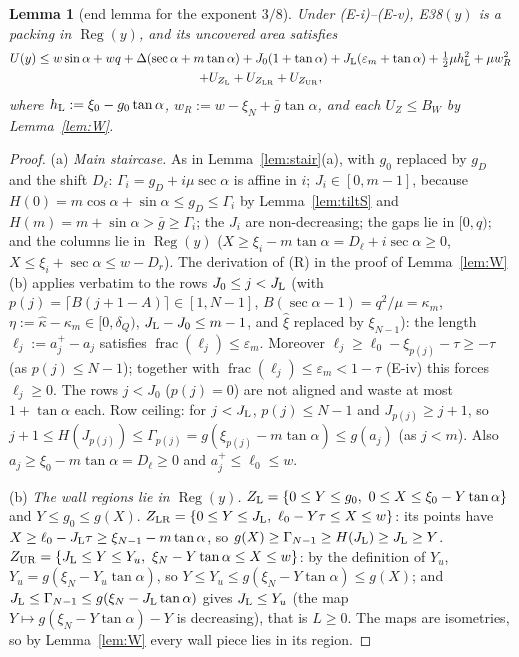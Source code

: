 \documentclass[11pt]{amsart}
\newcommand{\Reg}{\operatorname{Reg}}
\newcommand{\ca}{\cos\alpha}
\newcommand{\sa}{\sin\alpha}
\newcommand{\ta}{\tan\alpha}
\newcommand{\se}{\sec\alpha}
\newtheorem{lemma}[theorem]{Lemma}
\theoremstyle{definition}
\theoremstyle{remark}
\numberwithin{equation}{section}
\begin{document}
\begin{lemma}[end lemma for the exponent $3/8$]\label{lem:E38}
Under (E-i)--(E-v), E38$(y)$ is a packing in $\Reg(y)$, and its uncovered area satisfies
\begin{multline*}
U(y)\le w\sa+wq+\Delta(\se+m\ta)+J_0(1+\ta)+J_{\rm L}(\varepsilon_m+\ta)+\tfrac12\mu h_{\rm L}^2+\mu w_R^2\\
+U_{Z_{\rm L}}+U_{Z_{\rm LR}}+U_{Z_{\rm UR}},
\end{multline*}
where $h_{\rm L}:=\xi_0-g_0\ta$, $w_R:=w-\xi_N+\bar g\ta$, and each $U_Z\le B_W$ by Lemma~\ref{lem:W}.
\end{lemma}

\begin{proof}
(a) \emph{Main staircase.} As in Lemma~\ref{lem:stair}(a), with $g_0$ replaced by $g_D$ and the shift $D_\ell$:
$\Gamma_i=g_D+i\mu\se$ is affine in $i$; $J_i\in[0,m-1]$, because $H(0)=m\ca+\sa\le g_D\le\Gamma_i$ by
Lemma~\ref{lem:tiltS} and $H(m)=m+\sa>\bar g\ge\Gamma_i$; the $J_i$ are non-decreasing; the gaps lie in $[0,q)$; and the
columns lie in $\Reg(y)$ ($X\ge\xi_i-m\ta=D_\ell+i\se\ge0$, $X\le\xi_i+\se\le w-D_r$). The derivation of (R) in the proof
of Lemma~\ref{lem:W}(b) applies verbatim to the rows $J_0\le j<J_{\rm L}$ (with $p(j)=\lceil B(j+1-A)\rceil\in[1,N-1]$,
$B(\se-1)=q^2/\mu=\kappa_m$, $\eta:=\hat\kappa-\kappa_m\in[0,\delta_Q)$, $J_{\rm L}-J_0\le m-1$, and $\hat\xi$ replaced
by $\xi_{N-1}$): the length $\ell_j:=a_j^+-a_j$ satisfies $\operatorname{frac}(\ell_j)\le\varepsilon_m$. Moreover
$\ell_j\ge\ell_0-\xi_{p(j)}-\tau\ge-\tau$ (as $p(j)\le N-1$); together with $\operatorname{frac}(\ell_j)\le\varepsilon_m<
1-\tau$ (E-iv) this forces $\ell_j\ge0$. The rows $j<J_0$ ($p(j)=0$) are not aligned and waste at most $1+\ta$ each. Row
ceiling: for $j<J_{\rm L}$, $p(j)\le N-1$ and $J_{p(j)}\ge j+1$, so
$j+1\le H(J_{p(j)})\le\Gamma_{p(j)}=g(\xi_{p(j)}-m\ta)\le g(a_j)$ (as $j<m$). Also $a_j\ge\xi_0-m\ta=D_\ell\ge0$ and
$a_j^+\le\ell_0\le w$.

(b) \emph{The wall regions lie in $\Reg(y)$.} $Z_{\rm L}=\{0\le Y\le g_0,\ 0\le X\le\xi_0-Y\ta\}$ and $Y\le g_0\le g(X)$.
$Z_{\rm LR}=\{0\le Y\le J_{\rm L},\ \ell_0-Y\tau\le X\le w\}$: its points have $X\ge\ell_0-J_{\rm L}\tau\ge\xi_{N-1}-m\ta$,
so $g(X)\ge\Gamma_{N-1}\ge H(J_{\rm L})\ge J_{\rm L}\ge Y$. $Z_{\rm UR}=\{J_{\rm L}\le Y\le Y_u,\ \xi_N-Y\ta\le X\le w\}$:
by the definition of $Y_u$, $Y_u=g(\xi_N-Y_u\ta)$, so $Y\le Y_u\le g(\xi_N-Y\ta)\le g(X)$; and
$J_{\rm L}\le\Gamma_{N-1}\le g(\xi_N-J_{\rm L}\ta)$ gives $J_{\rm L}\le Y_u$ (the map $Y\mapsto g(\xi_N-Y\ta)-Y$ is
decreasing), that is $L\ge0$. The maps are isometries, so by Lemma~\ref{lem:W} every wall piece lies in its region.


\end{proof}
\end{document}
